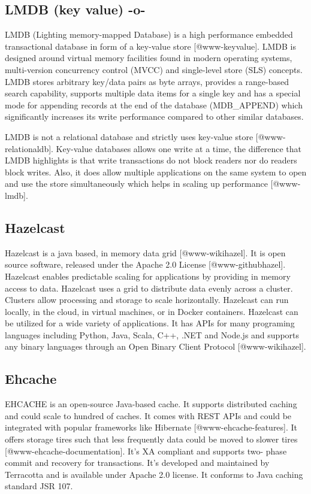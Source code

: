 \subsection{LMDB (key value) -o-}

LMDB (Lighting memory-mapped Database) is a high performance embedded
transactional database in form of a key-value
store [@www-keyvalue]. LMDB is designed around virtual memory
facilities found in modern operating systems, multi-version
concurrency control (MVCC) and single-level store (SLS) concepts. LMDB
stores arbitrary key/data pairs as byte arrays, provides a range-based
search capability, supports multiple data items for a single key and
has a special mode for appending records at the end of the database
(MDB\_APPEND) which significantly increases its write performance
compared to other similar databases.

LMDB is not a relational database and strictly uses key-value
store [@www-relationaldb].  Key-value databases allows one write
at a time, the difference that LMDB highlights is that write
transactions do not block readers nor do readers block writes. Also,
it does allow multiple applications on the same system to open and use
the store simultaneously which helps in scaling up
performance [@www-lmdb].



\subsection{Hazelcast}

Hazelcast is a java based, in memory data grid [@www-wikihazel].
It is open source software, released under the Apache 2.0
License [@www-githubhazel]. Hazelcast enables predictable scaling
for applications by providing in memory access to data.  Hazelcast
uses a grid to distribute data evenly across a cluster. Clusters allow
processing and storage to scale horizontally. Hazelcast can run
locally, in the cloud, in virtual machines, or in Docker
containers. Hazelcast can be utilized for a wide variety of
applications. It has APIs for many programing languages including
Python, Java, Scala, C++, .NET and Node.js and supports any binary
languages through an Open Binary Client Protocol [@www-wikihazel].

\subsection{Ehcache}

EHCACHE is an open-source Java-based cache. It supports distributed
caching and could scale to hundred of caches. It comes with REST APIs
and could be integrated with popular frameworks like
Hibernate [@www-ehcache-features]. It offers storage tires such
that less frequently data could be moved to slower
tires [@www-ehcache-documentation]. It's XA compliant and supports
two- phase commit and recovery for transactions. It's developed and
maintained by Terracotta and is available under Apache 2.0 license.
It conforms to Java caching standard JSR 107.

